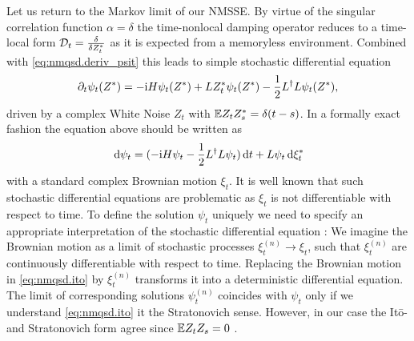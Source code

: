 Let us return to the Markov limit of our NMSSE\@.
By virtue of the singular correlation function $\alpha = \delta$ the time-nonlocal damping operator reduces to a time-local form $\mathcal{D}_t = \frac{\delta}{\delta {Z}^*_t}$ as it is expected from a memoryless environment.
Combined with \autoref{eq:nmqsd.deriv_psit} this leads to simple stochastic differential equation
\begin{equation*}
  \partial_t \psi_t({Z}^*) = -\mathrm{i} H \psi_t({Z}^*) + L{Z}^*_t\psi_t({Z}^*) - \frac{1}{2}L^\dagger L\psi_t({Z}^*),
\end{equation*}
driven by a complex White Noise $Z_t$ with $\E{Z_t \ZZ_s} = \delta(t-s)$.
In a formally exact fashion the equation above should be written as
\begin{equation}
  \, \mathrm{d}\psi_t = (-\mathrm{i}H\psi_t - \frac{1}{2} L^\dagger L \psi_t) \, \mathrm{d} t + L\psi_t \, \mathrm{d} {\xi}^*_t
  \label{eq:nmqsd.ito}
\end{equation}
with a standard complex Brownian motion $\xi_t$.
It is well known that such stochastic differential equations are problematic as $\xi_t$ is not differentiable with respect to time.
To define the solution $\psi_t$ uniquely we need to specify an appropriate interpretation of the stochastic differential equation \cite[p.~36]{Ok03_sde}:
We imagine the Brownian motion as a limit of stochastic processes $\xi^{(n)}_t \to \xi_t$, such that $\xi^{(n)}_t$ are continuously differentiable with respect to time.
Replacing the Brownian motion in \autoref{eq:nmqsd.ito} by $\xi^{(n)}_t$ transforms it into a deterministic differential equation.
The limit of corresponding solutions $\psi^{(n)}_t$ coincides with $\psi_t$ only if we understand \autoref{eq:nmqsd.ito} it the Stratonovich sense.
However, in our case the It\=o- and Stratonovich form agree since $\E Z_t Z_s = 0$ \cite{GaCr85_handbook}.\\


